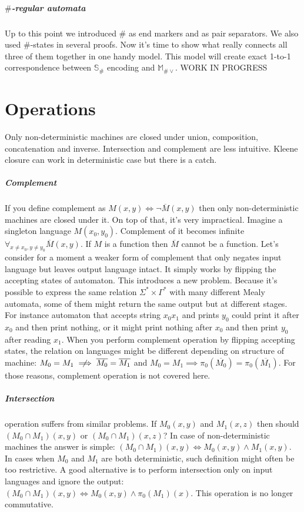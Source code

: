 \documentclass[12pt]{article}
\begin{document}
\subparagraph{$\#$-regular automata}Up to this point we introduced $\#$ as end markers and as pair separators. We also used $\#$-states in several proofs. Now it's time to show what really connects all three of them together in one handy model. This model will create exact 1-to-1 correspondence between $\mathbb{S}_\#$ encoding and $\mathbb{M}_{\#\vee}$. WORK IN PROGRESS




\section{Operations} Only non-deterministic machines are closed under union, composition, concatenation and inverse. Intersection and complement are less intuitive. Kleene closure can work in deterministic case but there is a catch.
\subparagraph{Complement} If you define complement as $M(x,y) \iff \neg \overline{M}(x,y)$ then only non-deterministic machines are closed under it. On top of that, it's very impractical. Imagine a singleton language $M(x_0,y_0)$. Complement of it becomes infinite $\forall_{x\ne x_0,y\ne y_0} \overline{M}(x,y)$. If $M$ is a function then $\overline{M} $ cannot be a function. Let's consider for a moment a weaker form of complement that only negates input language but leaves output language intact. It simply works by flipping the accepting states of automaton. This introduces a new problem. Because it's possible to express the same relation $\Sigma^* \times \Gamma^*$ with many different Mealy automata, some of them might return the same output but at different stages. For instance automaton that accepts string $x_0x_1$ and prints $y_0$ could print it after $x_0$ and then print nothing, or it might print nothing after $x_0$ and then print $y_0$ after reading $x_1$. When you perform complement operation by flipping accepting states, the relation on languages might be different depending on structure of machine: $M_0 = M_1 \centernot \implies \overline{M_0} = \overline{M_1}$ and $M_0 = M_1  \implies \pi_0(\overline{M_0}) = \pi_0(\overline{M_1})$. For those reasons, complement operation is not covered here.

\subparagraph{Intersection}  operation suffers from similar problems. If $M_0(x,y)$ and $M_1(x,z)$ then should $(M_0 \cap M_1)(x,y)$ or $(M_0 \cap M_1)(x,z)$? In case of non-deterministic machines the answer is simple: $(M_0 \cap M_1)(x,y) \iff M_0(x,y) \wedge M_1(x,y)$. In cases when $M_0$ and $M_1$ are both deterministic, such definition might often be too restrictive. A good alternative is to perform intersection only on input languages and ignore the output: $(M_0 \cap M_1)(x,y) \iff M_0(x,y) \wedge \pi_0(M_1)(x)$. This operation is no longer commutative. 
\end{document}

